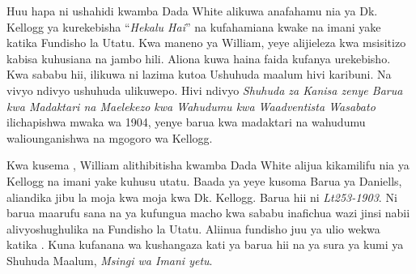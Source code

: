Huu hapa ni ushahidi kwamba Dada White alikuwa anafahamu nia ya Dk. Kellogg ya kurekebisha “\textit{Hekalu Hai}” na kufahamiana kwake na imani yake katika Fundisho la Utatu. Kwa maneno ya William, yeye alijieleza kwa msisitizo kabisa kuhusiana na jambo hili. Aliona kuwa haina faida kufanya urekebisho. Kwa sababu hii, ilikuwa ni lazima kutoa Ushuhuda maalum hivi karibuni. Na vivyo ndivyo ushuhuda ulikuwepo. Hivi ndivyo \textit{Shuhuda za Kanisa zenye Barua kwa Madaktari na Maelekezo kwa Wahudumu kwa Waadventista Wasabato} ilichapishwa mwaka wa 1904, yenye barua kwa madaktari na wahudumu waliounganishwa na mgogoro wa Kellogg.


Kwa kusema , William alithibitisha kwamba Dada White alijua kikamilifu nia ya Kellogg na imani yake kuhusu utatu. Baada ya yeye kusoma Barua ya Daniells, aliandika jibu la moja kwa moja kwa Dk. Kellogg. Barua hii ni \textit{Lt253-1903}. Ni barua maarufu sana na ya kufungua macho kwa sababu inafichua wazi jinsi nabii alivyoshughulika na Fundisho la Utatu. Aliinua fundisho juu ya  ulio wekwa katika . Kuna kufanana wa kushangaza kati ya barua hii na ya sura ya kumi ya Shuhuda Maalum, \textit{Msingi wa Imani yetu}.




